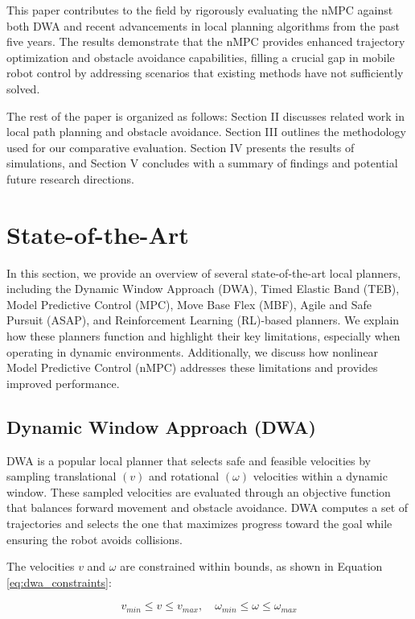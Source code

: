 \documentclass[conference]{IEEEtran}
\begin{document}
This paper contributes to the field by rigorously evaluating the nMPC against both DWA and recent advancements in local planning algorithms from the past five years. The results demonstrate that the nMPC provides enhanced trajectory optimization and obstacle avoidance capabilities, filling a crucial gap in mobile robot control by addressing scenarios that existing methods have not sufficiently solved.

The rest of the paper is organized as follows: Section II discusses related work in local path planning and obstacle avoidance. Section III outlines the methodology used for our comparative evaluation. Section IV presents the results of simulations, and Section V concludes with a summary of findings and potential future research directions.


\section{State-of-the-Art}

In this section, we provide an overview of several state-of-the-art local planners, including the Dynamic Window Approach (DWA), Timed Elastic Band (TEB), Model Predictive Control (MPC), Move Base Flex (MBF), Agile and Safe Pursuit (ASAP), and Reinforcement Learning (RL)-based planners. We explain how these planners function and highlight their key limitations, especially when operating in dynamic environments. Additionally, we discuss how nonlinear Model Predictive Control (nMPC) addresses these limitations and provides improved performance.

\subsection{Dynamic Window Approach (DWA)}
DWA is a popular local planner that selects safe and feasible velocities by sampling translational \((v)\) and rotational \((\omega)\) velocities within a dynamic window. These sampled velocities are evaluated through an objective function that balances forward movement and obstacle avoidance. DWA computes a set of trajectories and selects the one that maximizes progress toward the goal while ensuring the robot avoids collisions.

The velocities \(v\) and \(\omega\) are constrained within bounds, as shown in Equation \eqref{eq:dwa_constraints}:

\begin{equation}
\label{eq:dwa_constraints}
v_{min} \leq v \leq v_{max}, \quad \omega_{min} \leq \omega \leq \omega_{max}
\end{equation}
\end{document}
